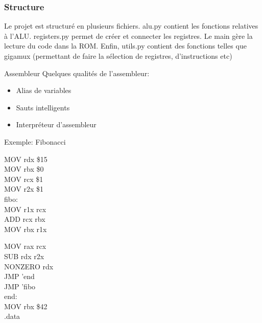 \documentclass[12pt]{beamer}
\begin{document}
\begin{frame}
\frametitle{Structure}
   
   Le projet est structuré en plusieurs fichiers. alu.py contient les fonctions relatives à 
   l'ALU. registers.py permet de créer et connecter les registres. Le main gère la lecture du code
   dans la ROM. Enfin, utils.py contient des fonctions telles que gigamux (permettant de faire la sélection
   de registres, d'instructions etc)
\end{frame}

\begin{frame}{Assembleur}
	Quelques qualités de l'assembleur:
	\begin{itemize}
	\item Alias de variables
	\item Sauts intelligents
	\item Interpréteur d'assembleur
	\end{itemize}
\end{frame}

\begin{frame}{Exemple: Fibonacci}

    \begin{minipage}[t]{0.48\linewidth}
        MOV  rdx \$15 \\
        MOV  rbx \$0 \\
        MOV  rcx \$1 \\

        MOV  r2x \$1 \\
        fibo: \\
        MOV   r1x rcx \\
        ADD   rcx rbx \\
        MOV   rbx r1x \\
    \end{minipage}\hfill
    \begin{minipage}[t]{0.48\linewidth}
        MOV   rax rcx \\
        SUB   rdx r2x \\
        NONZERO rdx \\
        JMP   'end \\
        JMP   'fibo \\
        
        end: \\
            MOV rbx \$42 \\
        
        .data \\
        \end{minipage}

\end{frame}
\end{document}
